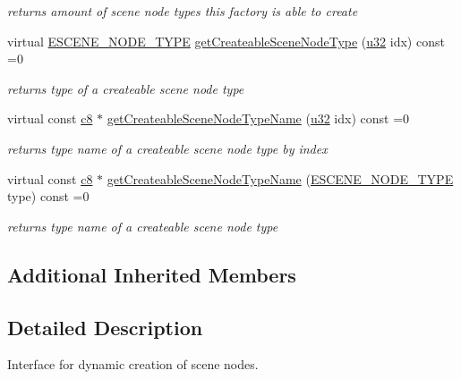 \begin{DoxyCompactItemize}
\begin{DoxyCompactList}\small\item\em returns amount of scene node types this factory is able to create \end{DoxyCompactList}\item 
virtual \hyperlink{namespaceirr_1_1scene_acad3d7ef92a9807d391ba29120f3b7bd}{E\+S\+C\+E\+N\+E\+\_\+\+N\+O\+D\+E\+\_\+\+T\+Y\+PE} \hyperlink{classirr_1_1scene_1_1ISceneNodeFactory_afc8a6858ebf0e396f111ffbd3d8f14e8}{get\+Createable\+Scene\+Node\+Type} (\hyperlink{namespaceirr_a0416a53257075833e7002efd0a18e804}{u32} idx) const  =0
\begin{DoxyCompactList}\small\item\em returns type of a createable scene node type \end{DoxyCompactList}\item 
virtual const \hyperlink{namespaceirr_a9395eaea339bcb546b319e9c96bf7410}{c8} $\ast$ \hyperlink{classirr_1_1scene_1_1ISceneNodeFactory_a5b743a2f17398d3de73a898004bee1b1}{get\+Createable\+Scene\+Node\+Type\+Name} (\hyperlink{namespaceirr_a0416a53257075833e7002efd0a18e804}{u32} idx) const  =0
\begin{DoxyCompactList}\small\item\em returns type name of a createable scene node type by index \end{DoxyCompactList}\item 
virtual const \hyperlink{namespaceirr_a9395eaea339bcb546b319e9c96bf7410}{c8} $\ast$ \hyperlink{classirr_1_1scene_1_1ISceneNodeFactory_ac214ed520c49594de077b697a658328a}{get\+Createable\+Scene\+Node\+Type\+Name} (\hyperlink{namespaceirr_1_1scene_acad3d7ef92a9807d391ba29120f3b7bd}{E\+S\+C\+E\+N\+E\+\_\+\+N\+O\+D\+E\+\_\+\+T\+Y\+PE} type) const  =0
\begin{DoxyCompactList}\small\item\em returns type name of a createable scene node type \end{DoxyCompactList}\end{DoxyCompactItemize}
\subsection*{Additional Inherited Members}


\subsection{Detailed Description}
Interface for dynamic creation of scene nodes. 

